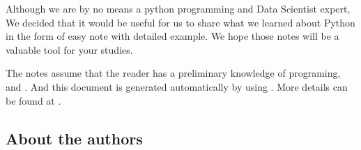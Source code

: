 \documentclass[letterpaper,12pt,english]{sphinxmanual}
\begin{document}
Although we are by no means a python programming and Data Scientist expert,
We decided that it would be useful for us to share what we learned
about Python in the form of easy note with detailed example.
We hope those notes will be a valuable tool for your studies.

The notes assume that the reader has a preliminary knowledge of  programing,  and . And this document is generated automatically by using . More details can be found at .


\subsection{About the authors}
\end{document}
